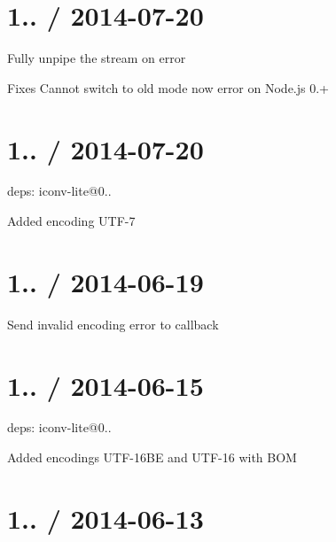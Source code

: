 \section*{1.. / 2014-\/07-\/20 }


\begin{DoxyItemize}
\item Fully unpipe the stream on error
\begin{DoxyItemize}
\item Fixes {\ttfamily Cannot switch to old mode now} error on Node.\+js 0.+
\end{DoxyItemize}
\end{DoxyItemize}

\section*{1.. / 2014-\/07-\/20 }


\begin{DoxyItemize}
\item deps\+: iconv-\/lite@0..
\begin{DoxyItemize}
\item Added encoding U\+T\+F-\/7
\end{DoxyItemize}
\end{DoxyItemize}

\section*{1.. / 2014-\/06-\/19 }


\begin{DoxyItemize}
\item Send invalid encoding error to callback
\end{DoxyItemize}

\section*{1.. / 2014-\/06-\/15 }


\begin{DoxyItemize}
\item deps\+: iconv-\/lite@0..
\begin{DoxyItemize}
\item Added encodings U\+T\+F-\/16\+B\+E and U\+T\+F-\/16 with B\+O\+M
\end{DoxyItemize}
\end{DoxyItemize}

\section*{1.. / 2014-\/06-\/13 }


